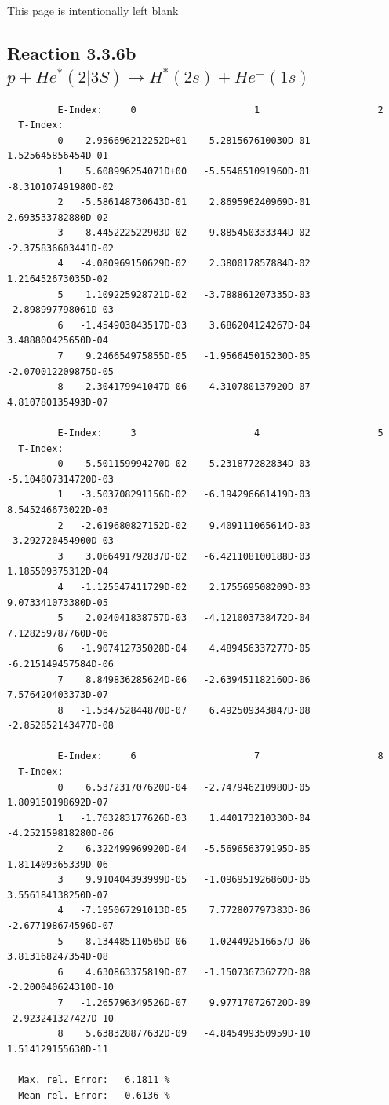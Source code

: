 \documentclass[12pt,dvips]{article}
\begin{document}
\newpage
This page is intentionally left blank
\newpage

\subsection{
Reaction 3.3.6b  $  p + He^*(2|3S) \rightarrow H^*(2s) + He^+(1s)$
}


\begin{small}\begin{verbatim}
         E-Index:     0                     1                     2
  T-Index:
         0   -2.956696212252D+01    5.281567610030D-01    1.525645856454D-01
         1    5.608996254071D+00   -5.554651091960D-01   -8.310107491980D-02
         2   -5.586148730643D-01    2.869596240969D-01    2.693533782880D-02
         3    8.445222522903D-02   -9.885450333344D-02   -2.375836603441D-02
         4   -4.080969150629D-02    2.380017857884D-02    1.216452673035D-02
         5    1.109225928721D-02   -3.788861207335D-03   -2.898997798061D-03
         6   -1.454903843517D-03    3.686204124267D-04    3.488800425650D-04
         7    9.246654975855D-05   -1.956645015230D-05   -2.070012209875D-05
         8   -2.304179941047D-06    4.310780137920D-07    4.810780135493D-07

         E-Index:     3                     4                     5
  T-Index:
         0    5.501159994270D-02    5.231877282834D-03   -5.104807314720D-03
         1   -3.503708291156D-02   -6.194296661419D-03    8.545246673022D-03
         2   -2.619680827152D-02    9.409111065614D-03   -3.292720454900D-03
         3    3.066491792837D-02   -6.421108100188D-03    1.185509375312D-04
         4   -1.125547411729D-02    2.175569508209D-03    9.073341073380D-05
         5    2.024041838757D-03   -4.121003738472D-04    7.128259787760D-06
         6   -1.907412735028D-04    4.489456337277D-05   -6.215149457584D-06
         7    8.849836285624D-06   -2.639451182160D-06    7.576420403373D-07
         8   -1.534752844870D-07    6.492509343847D-08   -2.852852143477D-08

         E-Index:     6                     7                     8
  T-Index:
         0    6.537231707620D-04   -2.747946210980D-05    1.809150198692D-07
         1   -1.763283177626D-03    1.440173210330D-04   -4.252159818280D-06
         2    6.322499969920D-04   -5.569656379195D-05    1.811409365339D-06
         3    9.910404393999D-05   -1.096951926860D-05    3.556184138250D-07
         4   -7.195067291013D-05    7.772807797383D-06   -2.677198674596D-07
         5    8.134485110505D-06   -1.024492516657D-06    3.813168247354D-08
         6    4.630863375819D-07   -1.150736736272D-08   -2.200040624310D-10
         7   -1.265796349526D-07    9.977170726720D-09   -2.923241327427D-10
         8    5.638328877632D-09   -4.845499350959D-10    1.514129155630D-11

  Max. rel. Error:   6.1811 %
  Mean rel. Error:   0.6136 %

\end{verbatim}\end{small}
\end{document}
